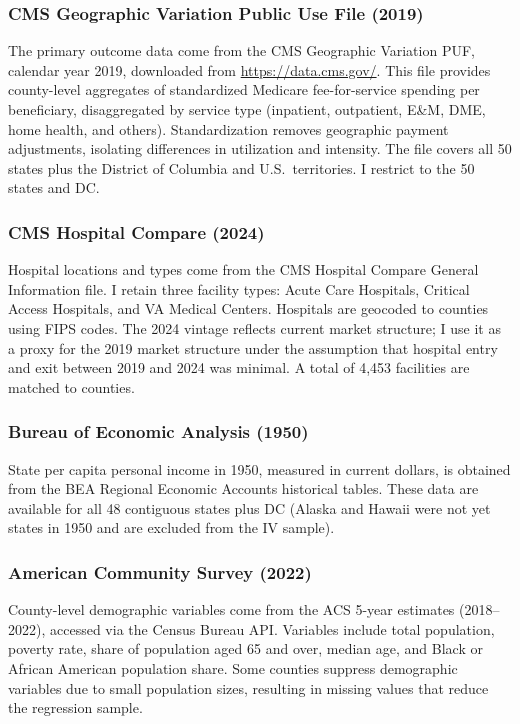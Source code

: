 \documentclass[12pt]{article}
\begin{document}
\subsubsection*{CMS Geographic Variation Public Use File (2019)} The primary outcome data come from the CMS Geographic Variation PUF, calendar year 2019, downloaded from \url{https://data.cms.gov/}. This file provides county-level aggregates of standardized Medicare fee-for-service spending per beneficiary, disaggregated by service type (inpatient, outpatient, E\&M, DME, home health, and others). Standardization removes geographic payment adjustments, isolating differences in utilization and intensity. The file covers all 50 states plus the District of Columbia and U.S.\ territories. I restrict to the 50 states and DC.

\subsubsection*{CMS Hospital Compare (2024)} Hospital locations and types come from the CMS Hospital Compare General Information file. I retain three facility types: Acute Care Hospitals, Critical Access Hospitals, and VA Medical Centers. Hospitals are geocoded to counties using FIPS codes. The 2024 vintage reflects current market structure; I use it as a proxy for the 2019 market structure under the assumption that hospital entry and exit between 2019 and 2024 was minimal. A total of 4,453 facilities are matched to counties.

\subsubsection*{Bureau of Economic Analysis (1950)} State per capita personal income in 1950, measured in current dollars, is obtained from the BEA Regional Economic Accounts historical tables. These data are available for all 48 contiguous states plus DC (Alaska and Hawaii were not yet states in 1950 and are excluded from the IV sample).

\subsubsection*{American Community Survey (2022)} County-level demographic variables come from the ACS 5-year estimates (2018--2022), accessed via the Census Bureau API. Variables include total population, poverty rate, share of population aged 65 and over, median age, and Black or African American population share. Some counties suppress demographic variables due to small population sizes, resulting in missing values that reduce the regression sample.
\end{document}
